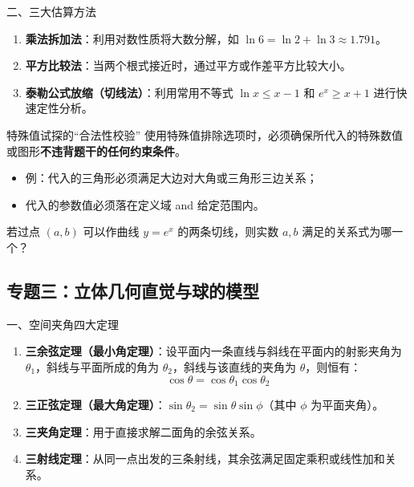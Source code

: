 \documentclass[11pt,a4paper]{ctexart}
\begin{document}
\begin{theorembox}{二、三大估算方法}
\begin{enumerate}
  \item \textbf{乘法拆加法}：利用对数性质将大数分解，如 \(\ln 6 = \ln 2 + \ln 3 \approx 1.791\)。
  \item \textbf{平方比较法}：当两个根式接近时，通过平方或作差平方比较大小。
  \item \textbf{泰勒公式放缩（切线法）}：利用常用不等式 \(\ln x \leqslant x - 1\) 和 \(e^x \geqslant x + 1\) 进行快速定性分析。
\end{enumerate}
\end{theorembox}

\begin{keybox}{特殊值试探的“合法性校验”}
使用特殊值排除选项时，必须确保所代入的特殊数值或图形\textbf{不违背题干的任何约束条件}。
\begin{itemize}
  \item 例：代入的三角形必须满足大边对大角或三角形三边关系；
  \item 代入的参数值必须落在定义域 and 给定范围内。
\end{itemize}
\end{keybox}

{\small 若过点 $(a,b)$ 可以作曲线 $y = e^x$ 的两条切线，则实数 $a, b$ 满足的关系式为哪一个？}

\newpage

\subsection{专题三：立体几何直觉与球的模型}

\begin{theorembox}{一、空间夹角四大定理}
\begin{enumerate}
  \item \textbf{三余弦定理（最小角定理）}：设平面内一条直线与斜线在平面内的射影夹角为 $\theta_1$，斜线与平面所成的角为 $\theta_2$，斜线与该直线的夹角为 $\theta$，则恒有：
  \[
    \cos\theta = \cos\theta_1 \cos\theta_2
  \]
  \item \textbf{三正弦定理（最大角定理）}：\(\sin\theta_2 = \sin\theta \sin\phi\)（其中 $\phi$ 为平面夹角）。
  \item \textbf{三夹角定理}：用于直接求解二面角的余弦关系。
  \item \textbf{三射线定理}：从同一点出发的三条射线，其余弦满足固定乘积或线性加和关系。
\end{enumerate}
\end{theorembox}
\end{document}
